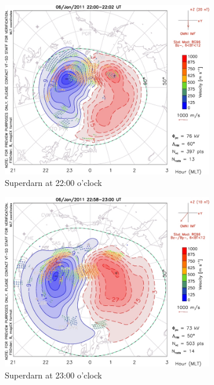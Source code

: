 \documentclass[10pt,a4paper]{article}
\begin{document}
\begin{figure}[h]
\begin{subfigure}{0.3\textwidth}
\centering
	\includegraphics[width=\textwidth]{Superdarn5.jpg}
	\caption{ Superdarn at 22:00 o'clock \label{Super_22}}
\end{subfigure}
\begin{subfigure}{0.3\textwidth}
\centering
	\includegraphics[width=\textwidth]{Superdarn6.jpg}
	\caption{ Superdarn at 23:00 o'clock \label{Super_23}}
\end{subfigure}
\begin{subfigure}{0.3\textwidth}
\centering

\end{subfigure}
\end{figure}
\end{document}
